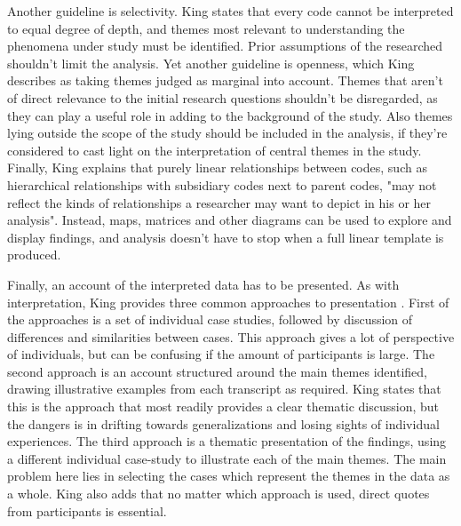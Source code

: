 \documentclass[english]{tktltiki2}
\theoremstyle{definition}
\theoremstyle{remark}
\begin{document}
Another guideline is selectivity. King states that every code cannot be interpreted to equal degree of depth, and themes most relevant to understanding the phenomena under study must be identified. Prior assumptions of the researched shouldn't limit the analysis. Yet another guideline is openness, which King describes as taking themes judged as marginal into account. Themes that aren't of direct relevance to the initial research questions shouldn't be disregarded, as they can play a useful role in adding to the background of the study. Also themes lying outside the scope of the study should be included in the analysis, if they're considered to cast light on the interpretation of central themes in the study. Finally, King explains that purely linear relationships between codes, such as hierarchical relationships with subsidiary codes next to parent codes, "may not reflect the kinds of relationships a researcher may want to depict in his or her analysis". Instead, maps, matrices and other diagrams can be used to explore and display findings, and analysis doesn't have to stop when a full linear template is produced.

Finally, an account of the interpreted data has to be presented. As with interpretation, King provides three common approaches to presentation \cite{king2004using}. First of the approaches is a set of individual case studies, followed by discussion of differences and similarities between cases. This approach gives a lot of perspective of individuals, but can be confusing if the amount of participants is large. The second approach is an account structured around the main themes identified, drawing illustrative examples from each transcript as required. King states that this is the approach that most readily provides a clear thematic discussion, but the dangers is in drifting towards generalizations and losing sights of individual experiences. The third approach is a thematic presentation of the findings, using a different individual case-study to illustrate each of the main themes. The main problem here lies in selecting the cases which represent the themes in the data as a whole. King also adds that no matter which approach is used, direct quotes from participants is essential.  
\end{document}
